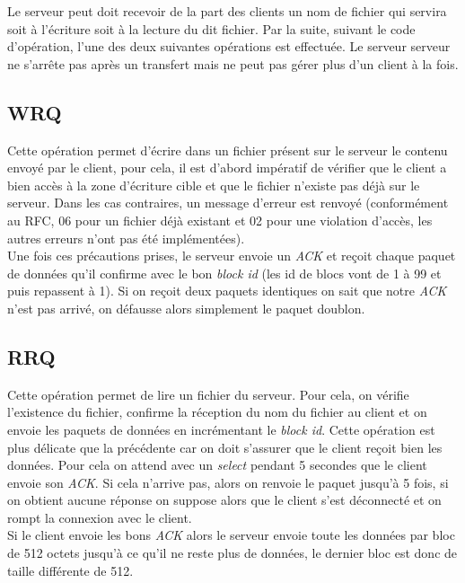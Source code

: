 \documentclass{article}
\begin{document}
    Le serveur peut doit recevoir de la part des clients un nom de fichier qui servira soit à l'écriture soit à la lecture du dit fichier. Par la suite, suivant le code d'opération, l'une des deux suivantes opérations est effectuée. Le serveur serveur ne s'arrête pas après un transfert mais ne peut pas gérer plus d'un client à la fois.
    
    \subsection{WRQ}
    
        Cette opération permet d'écrire dans un fichier présent sur le serveur le contenu envoyé par le client, pour cela, il est d'abord impératif de vérifier que le client a bien accès à la zone d'écriture cible et que le fichier n'existe pas déjà sur le serveur. Dans les cas contraires, un message d'erreur est renvoyé (conformément au RFC, 06 pour un fichier déjà existant et 02 pour une violation d'accès, les autres erreurs n'ont pas été implémentées).\\
        Une fois ces précautions prises, le serveur envoie un \emph{ACK} et reçoit chaque paquet de données qu'il confirme avec le bon \emph{block id} (les id de blocs vont de 1 à 99 et puis repassent à 1). Si on reçoit deux paquets identiques on sait que notre \emph{ACK} n'est pas arrivé, on défausse alors simplement le paquet doublon.
    
    \subsection{RRQ}
        Cette opération permet de lire un fichier du serveur. Pour cela, on vérifie l'existence du fichier, confirme la réception du nom du fichier au client et on envoie les paquets de données en incrémentant le \emph{block id}. Cette opération est plus délicate que la précédente car on doit s'assurer que le client reçoit bien les données. Pour cela on attend avec un \emph{select} pendant 5 secondes que le client envoie son \emph{ACK}. Si cela n'arrive pas, alors on renvoie le paquet jusqu'à 5 fois, si on obtient aucune réponse on suppose alors que le client s'est déconnecté et on rompt la connexion avec le client.\\
        Si le client envoie les bons \emph{ACK} alors le serveur envoie toute les données par bloc de 512 octets jusqu'à ce qu'il ne reste plus de données, le dernier bloc est donc de taille différente de 512.

\clearpage
\end{document}
